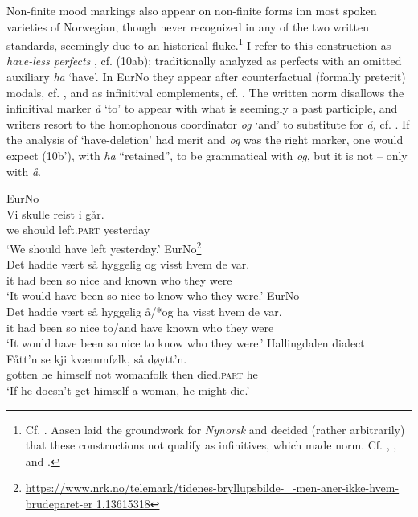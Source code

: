 \documentclass[output=paper]{langscibook}
\begin{document}
Non-finite mood markings also appear on non-finite forms inn most spoken varieties of Norwegian, though never recognized in any of the two written standards, seemingly due to an historical fluke.\footnote{Cf. \citet{Aasen1864}. Aasen laid the groundwork for \textit{Nynorsk} and decided (rather arbitrarily) that these constructions not qualify as infinitives, which made norm. Cf. \citet{Eide2011Ghost, Eide2021}, \citet{Aa2022}, and \citet{Sandøy1991}.} I refer to this construction as \textit{have-less perfects} \citep{Eide2021}, cf. (10ab); traditionally analyzed as perfects with an omitted auxiliary \textit{ha} ‘have’. In EurNo they appear after counterfactual (formally preterit) modals, cf. , and as infinitival complements, cf. . The written norm disallows the infinitival marker \textit{å} `to' to appear with what is seemingly a past participle, and writers resort to the homophonous coordinator \textit{og} ‘and’ to substitute for \textit{å,} cf. . If the analysis of ‘have-deletion’ had merit and \textit{og} was the right marker, one would expect (10b’), with \textit{ha} “retained”, to be grammatical with \textit{og}, but it is not – only with \textit{å}. 

\ea%
    \label{ex:eide:10}
    \ea \label{ex:eide:10a} EurNo\\
    \gll Vi skulle reist {i gå}r.\\
         we should left.\textsc{part} yesterday\\
    \glt ‘We should have left yesterday.’
    \ex \label{ex:eide:10b} EurNo\footnote{\url{https://www.nrk.no/telemark/tidenes-bryllupsbilde-\_-men-aner-ikke-hvem-brudeparet-er 1.13615318}}\\
    \gll Det hadde vært så hyggelig og visst hvem de var.    \\
         it had been so nice and known who they were \\
    \glt ‘It would have been so nice to know who they were.’
     \label{ex:eide:10b'} EurNo\\
    \gll Det hadde vært så hyggelig å/*og ha visst hvem de var.\\
         it had been so nice to/and have known who they were\\
    \glt ‘It would have been so nice to know who they were.’
    \ex \label{ex:eide:10c} Hallingdalen dialect\\
    \gll Fått’n se kji kvæmmfølk, så døytt’n.         \\
         {gotten he} himself not womanfolk then {died.\textsc{part} he} \\
    \glt ‘If he doesn’t get himself a woman, he might die.’   
    \z %
\z
          
\end{document}
